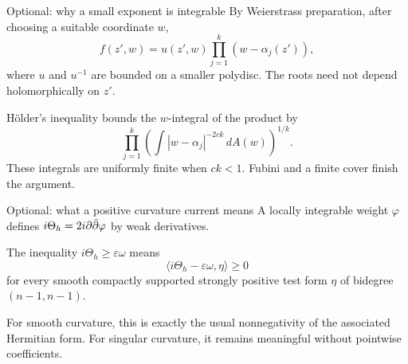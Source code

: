 \begin{frame}{Optional: why a small exponent is integrable}
By Weierstrass preparation, after choosing a suitable coordinate \(w\),
\[
f(z',w)=u(z',w)\prod_{j=1}^k(w-\alpha_j(z')),
\]
where \(u\) and \(u^{-1}\) are bounded on a smaller polydisc.
The roots need not depend holomorphically on \(z'\).
\par\medskip
Hölder's inequality bounds the \(w\)-integral of the product by
\[
\prod_{j=1}^k\left(\int |w-\alpha_j|^{-2ck}\,dA(w)\right)^{1/k}.
\]
These integrals are uniformly finite when \(ck<1\). Fubini and a finite cover finish the argument.
\end{frame}

\begin{frame}{Optional: what a positive curvature current means}
A locally integrable weight \(\varphi\) defines \(i\Theta_h=2i\partial\bar\partial\varphi\) by weak derivatives.
\par\medskip
The inequality \(i\Theta_h\ge\varepsilon\omega\) means
\[
\langle i\Theta_h-\varepsilon\omega,\eta\rangle\ge0
\]
for every smooth compactly supported strongly positive test form \(\eta\) of bidegree \((n-1,n-1)\).
\par\medskip
For smooth curvature, this is exactly the usual nonnegativity of the associated Hermitian form. For singular curvature, it remains meaningful without pointwise coefficients.
\end{frame}


